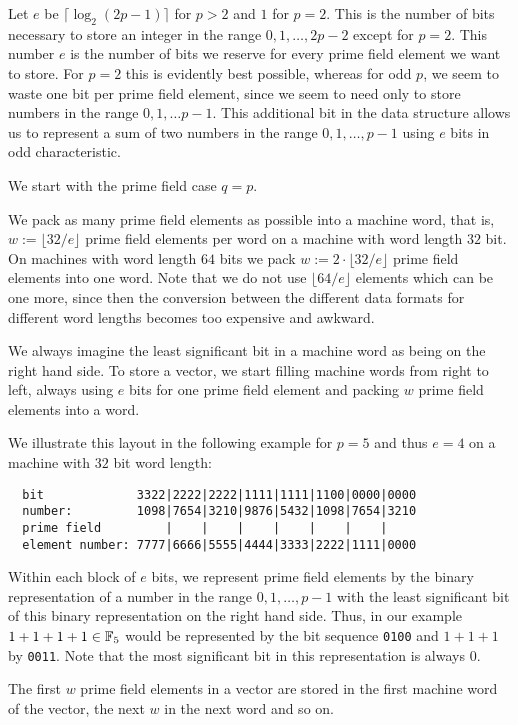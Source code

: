 Let $e$ be $\lceil \log_2(2p-1)\rceil$ for $p > 2$ and $1$ for $p=2$. 
This is the number of bits
necessary to store an integer in the range $0,1, \ldots, 2p-2$ except
for $p=2$. This number $e$ is the number of bits we 
reserve for every prime field element we want to store. For $p=2$ this
is evidently best possible, whereas for odd $p$, we seem to waste
one bit per prime field element, since we seem to need only to store
numbers in the range $0,1,\ldots p-1$. This additional bit in the
data structure allows us to represent a sum of two numbers in the
range $0,1,\ldots, p-1$ using $e$ bits in odd characteristic.

We start with the prime field case $q=p$.

We pack as many prime field elements as possible into a machine
word, that is, $w := \lfloor 32/e \rfloor$ prime field elements per word
on a machine with word length $32$ bit. On machines with word length $64$ bits
we pack $w := 2 \cdot \lfloor 32/e \rfloor$ prime field elements into one word.
Note that we do not use $\lfloor 64/e \rfloor$ elements which can be one
more, since then the conversion between the different data formats for
different word lengths becomes too expensive and awkward.

We always imagine the least significant bit in a machine word as being 
on the right hand side. To store a vector, we start filling machine words 
from right to left, always using $e$ bits for one prime field element and
packing $w$ prime field elements into a word.

We illustrate this layout in the following example for $p=5$ and thus
$e=4$ on a machine with $32$ bit word length:

\begin{verbatim}
  bit             3322|2222|2222|1111|1111|1100|0000|0000
  number:         1098|7654|3210|9876|5432|1098|7654|3210
  prime field         |    |    |    |    |    |    |
  element number: 7777|6666|5555|4444|3333|2222|1111|0000
\end{verbatim}

Within each block of $e$ bits, we represent prime field elements
by the binary representation of a number in the range $0,1,\ldots,p-1$
with the least significant bit of this binary representation on the
right hand side. Thus, in our example $1+1+1+1 \in \mathbb{F}_5$ would be
represented by the bit sequence \texttt{0100} and $1+1+1$ by \texttt{0011}.
Note that the most significant bit in this representation is always $0$.

The first $w$ prime field elements in a vector are stored in the first
machine word of the vector, the next $w$ in the next word and so on.

